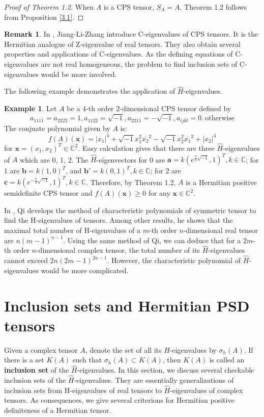 \documentclass[10pt,reqno]{amsart}
\theoremstyle{definition}
\newtheorem{remk}[thm]{Remark}
\newtheorem{exam}[thm]{Example}
\begin{document}
\begin{proof}[Proof of Theorem 1.2]  When $A$ is a CPS tensor, $S_{A}=A$. Theorem 1.2 follows from Proposition \ref{3.1}.
\end{proof}
\begin{remk}
In \cite{JLZ}, Jiang-Li-Zhang introduce C-eigenvalues of CPS tensors. It is the Hermitian analogue of Z-eigenvalue of real tensors. They also obtain several properties and applications of C-eigenvalues. As the defining equations of C-eigenvalues are not real homogeneous, the problem to find inclusion sets of C-eigenvalues would be more involved.  
\end{remk}
The following example demonstrates the application of $\hat{H}$-eigenvalues.
\begin{exam}
Let $A$ be a $4$-th order 2-dimensional CPS tensor defined by
 $$a_{11\bar{1}\bar{1}}=a_{22\bar{2}\bar{2}}=1, a_{11\bar{2}\bar{2}}=\sqrt{-1}, a_{22\bar{1}\bar{1}}=-\sqrt{-1}, a_{ij\bar{k}\bar{l}}=0.\ \text{otherwise}$$
The conjuate polynomial given by $A$ is: $$f(A)(\mathbf{x})=|x_1|^4+\sqrt{-1}x_1^2\overline{x_2}^2-\sqrt{-1}x_2^2\overline{x_1}^2+|x_2|^4$$ for $\mathbf{x}=(x_1,x_2)^T\in \mathbb C^2.$ Easy calculation gives that there are three $\hat{H}$-eigenvalues of $A$ which are 0, 1, 2. The
$\hat{H}$-eigenvectors for 0 are $\mathbf{a}=k(e^{\frac{\pi}{4}\sqrt{-1}},1)^T, k\in \mathbb C$; for $1$ are $\mathbf{b}=k(1,0)^T$, and $\mathbf{b'}=k(0,1)^T, k\in \mathbb C$; for $2$ are $\mathbf{c}=k(e^{-\frac{\pi}{4}\sqrt{-1}},1)^T, k\in \mathbb C$. Therefore, by Theorem 1.2, $A$ is a Hermitian positive semidefinite CPS tensor and $f(A)(\mathbf{x})\geq 0$ for any $\mathbf{x}\in \mathbb C^2$.
\end{exam}
In \cite{Q1}, Qi develops the method of characteristic polynomials of symmetric tensor to find the H-eigenvalues of tensors. Among other results, he shows that the maximal total number of H-eigenvalues of a $m$-th order $n$-dimensional real tensor are $n(m-1)^{n-1}$. Using the same method of Qi, we can deduce that for a $2m$-th order $n$-dimensional complex tensor, the total number of its $\hat{H}$-eigenvalues cannot exceed $2n(2m-1)^{2n-1}$. However, the characteristic polynomial of $\hat{H}$-eigenvalues would be more complicated. 

\section{Inclusion sets and Hermitian PSD tensors}
Given a complex tensor $A$, denote the set of all its $\hat{H}$-eigenvalues by $\sigma_h(A)$. If there is a set $K(A)$ such that $\sigma_h(A)\subset K(A)$, then $K(A)$ is called an \textbf{inclusion set} of the $\hat{H}$-eigenvalues. In this section, we discuss several checkable inclusion sets of the $\hat{H}$-eigenvalues. They are essentially generalizations of inclusion sets from H-eigenvalues of real tensors to $\hat{H}$-eigenvalues of complex tensors. As consequences, we give several criterions for Hermitian positive definiteness of a Hermitian tensor.
\end{document}
